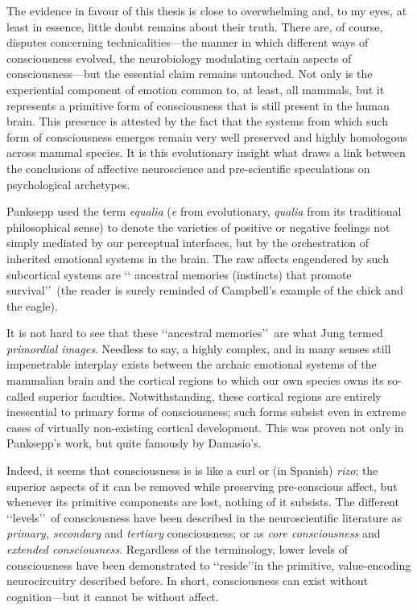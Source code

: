 \documentclass[a4paper]{article}
\begin{document}
The evidence in favour of this thesis is close to overwhelming and, to my eyes,
at least in essence, little doubt remains about their truth. There are, of
course, disputes concerning technicalities---the manner in which different
ways of consciousness evolved, the neurobiology modulating certain aspects of
consciousness---but the essential claim remains untouched. Not only is the
experiential component of emotion common to, at least, all mammals, but it
represents a primitive form of consciousness that is still present in the human
brain. This presence is attested by the fact that the systems from which such
form of consciousness emerges remain very well preserved and highly homologous
across mammal species. It is this evolutionary insight what draws a link between
the conclusions of affective neuroscience and pre-scientific speculations on
psychological archetypes.

Panksepp used the term \textit{equalia} (\textit{e} from evolutionary,
\textit{qualia} from its traditional philosophical sense) to denote the
varieties of positive or negative feelings not simply mediated by our perceptual
interfaces, but by the orchestration of inherited emotional systems in the
brain. The raw affects engendered by such subcortical systems are \lq\lq
ancestral memories (instincts) that promote survival\rq\rq\ (the reader is
surely reminded of Campbell's example of the chick and the eagle).  

It is not hard to see that these \lq\lq ancestral memories\rq\rq\ are what Jung
termed \textit{primordial images}. Needless to say, a highly complex, and in
many senses still impenetrable interplay exists between the archaic emotional
systems of the mammalian brain and the cortical regions to which our own species
owns its so-called superior faculties. Notwithstanding, these cortical
regions are entirely inessential to primary forms of consciousness; such forms
subsist even in extreme cases of virtually non-existing cortical development.
This was proven not only in Panksepp's work, but quite famously by Damasio's. 

Indeed, it seems that consciousness is is like a curl or (in Spanish)
\textit{rizo}; the superior aspects of it can be removed while preserving
pre-conscious affect, but whenever its primitive components are lost, nothing of
it subsists. The different \lq\lq levels\rq\rq \ of consciousness have been
described in the neuroscientific literature as \textit{primary, secondary} and
\textit{tertiary} consciousness; or as \textit{core consciousness} and
\textit{extended consciousness}. Regardless of the terminology, lower levels of
consciousness have been demonstrated to \lq\lq reside\rq\rq in the primitive,
value-encoding neurocircuitry described before. In short, consciousness can
exist without cognition---but it cannot be without affect.
\end{document}
